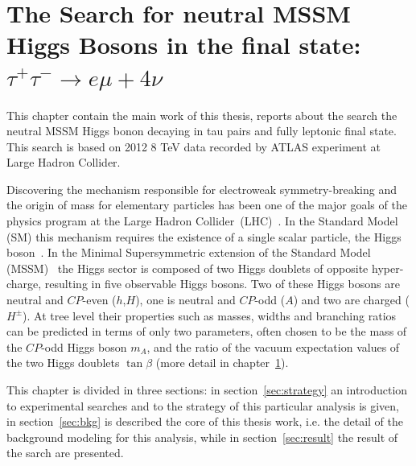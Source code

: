 \chapter[Neutral MSSM Higgs Search...]{The Search for neutral MSSM Higgs Bosons in the final state:
$\tau^{+}\tau^{-} \rightarrow e \mu + 4\nu$}

This chapter contain the main work of this thesis, reports about the search 
the neutral MSSM Higgs bonon decaying in tau pairs
and fully leptonic final state. This search is based on 2012 8 TeV data
recorded by ATLAS experiment at Large Hadron Collider.

Discovering the mechanism responsible for electroweak
symmetry-breaking and the origin of mass for elementary particles has been
one of the major goals of the physics program at the Large Hadron
Collider~(LHC)~\cite{LHC}.  In the Standard Model (SM) this mechanism
requires the existence of a single scalar particle, the Higgs
boson~\cite{ENGLERT,HIGGS,HIGGS2,HIGGS3,Guralnik:1964eu}.
In the Minimal Supersymmetric extension of the Standard Model
(MSSM)~\cite{MSSM1, MSSM2} the Higgs sector is composed of two Higgs
doublets of opposite hyper-charge, resulting in five observable Higgs
bosons.  Two of these Higgs bosons are neutral and $CP$-even
($h$,$H$), one is neutral and $CP$-odd ($A$) and two are charged
($H^\pm$).  At tree level their properties such as masses, widths and
branching ratios can be predicted in terms of only two parameters,
often chosen to be the mass of the $CP$-odd Higgs boson $m_A$, and
the ratio of the vacuum expectation values of the two Higgs doublets
$\tan\beta$ (more detail in chapter~\ref{}).  

This chapter is divided in three sections:
in section~\ref{sec:strategy} an introduction to experimental searches and to the strategy
of this particular analysis is given, in section~\ref{sec:bkg} is described the core of this thesis
work, i.e. the detail of the background modeling for this analysis, while in section~\ref{sec:result}
the result of the sarch are presented.


\clearpage

